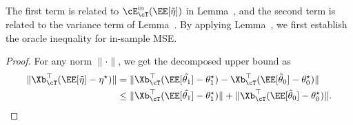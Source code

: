 \documentclass[12pt,a4paper,pdftex,onepage]{article}
\newcommand{\inn}{\operatorname{in}}
\begin{document}
\begin{remark}
The first term is related to $\cE_{\cT}^{\inn}(\EE[\tilde{\eta}])$ in Lemma~, and the second term is related to the variance term of Lemma~.
By applying Lemma~, we first establish the oracle inequality for in-sample MSE.
\end{remark}

\begin{proof}
For any norm $ \| \cdot \|$, we get the decomposed upper bound as
\begin{align*}
\|\Xb_\cT^\top (\EE[\tilde{\eta}] -\eta^\star) \| &=  \|\Xb_\cT^\top (\EE[\tilde{\theta_1}] -\theta_1^\star) - \Xb_\cT^\top (\EE[\tilde{\theta}_0] -\theta_0^\star)  \|\\
&\leq \|\Xb_\cT^\top (\EE[\tilde{\theta_1}] -\theta_1^\star) \|  +\| \Xb_\cT^\top (\EE[\tilde{\theta}_0] -\theta_0^\star)  \|.
\end{align*}


\end{proof}
\end{document}
